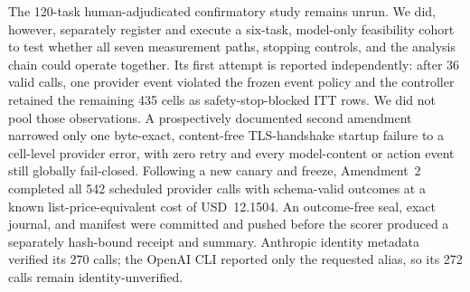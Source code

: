 \documentclass[11pt]{article}
\begin{document}
The 120-task human-adjudicated confirmatory study remains unrun. We did, however, separately register and execute a six-task, model-only feasibility cohort to test whether all seven measurement paths, stopping controls, and the analysis chain could operate together. Its first attempt is reported independently: after 36 valid calls, one provider event violated the frozen event policy and the controller retained the remaining 435 cells as safety-stop-blocked ITT rows. We did not pool those observations. A prospectively documented second amendment narrowed only one byte-exact, content-free TLS-handshake startup failure to a cell-level provider error, with zero retry and every model-content or action event still globally fail-closed. Following a new canary and freeze, Amendment~2 completed all 542 scheduled provider calls with schema-valid outcomes at a known list-price-equivalent cost of USD~12.1504. An outcome-free seal, exact journal, and manifest were committed and pushed before the scorer produced a separately hash-bound receipt and summary. Anthropic identity metadata verified its 270 calls; the OpenAI CLI reported only the requested alias, so its 272 calls remain identity-unverified.
\end{document}
